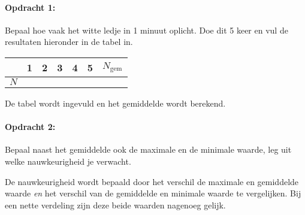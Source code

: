 \begin{minipage}[t]{1\columnwidth}%

\paragraph{Opdracht 1:}

Bepaal hoe vaak het witte ledje in 1 minuut oplicht. Doe dit 5 keer
en vul de resultaten hieronder in de tabel in.

\smallskip{}


\begin{tabular}{|x{.11\textwidth}|x{.11\textwidth}|x{.11\textwidth}
                |x{.11\textwidth}|x{.11\textwidth}|x{.11\textwidth}
                |x{.11\textwidth}|}
     & 1 & 2 & 3 & 4 & 5 & $N_\textrm{gem}$\\
    \hline
    $N$ &  &  &  &  &  & \tabularnewline
    \hline
\end{tabular}%

\smallskip{}

De tabel wordt ingevuld en het gemiddelde wordt berekend.%
\end{minipage}

\bigskip{}

\begin{minipage}[t]{1\columnwidth}%

\paragraph{Opdracht 2:}

Bepaal naast het gemiddelde ook de maximale en de minimale
waarde, leg uit welke nauwkeurigheid je verwacht.

De nauwkeurigheid wordt bepaald door het verschil de maximale en gemiddelde
waarde \textit{en} het verschil van de gemiddelde en minimale waarde
te vergelijken. Bij een nette verdeling zijn deze beide waarden nagenoeg
gelijk.%
\end{minipage}

\bigskip{}


